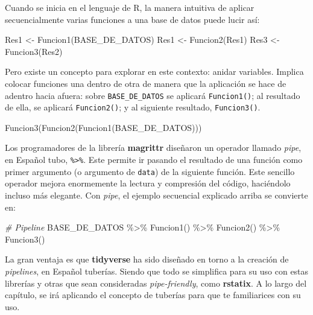 \documentclass[
]{article}
\newenvironment{Shaded}{\begin{snugshade}}{\end{snugshade}}
\newcommand{\CommentTok}[1]{\textcolor[rgb]{0.56,0.35,0.01}{\textit{#1}}}
\newcommand{\FunctionTok}[1]{\textcolor[rgb]{0.00,0.00,0.00}{#1}}
\newcommand{\NormalTok}[1]{#1}
\newcommand{\OtherTok}[1]{\textcolor[rgb]{0.56,0.35,0.01}{#1}}
\newcommand{\SpecialCharTok}[1]{\textcolor[rgb]{0.00,0.00,0.00}{#1}}
\theoremstyle{definition}
\theoremstyle{definition}
\theoremstyle{definition}
\theoremstyle{definition}
\theoremstyle{remark}
\begin{document}
Cuando se inicia en el lenguaje de R, la manera intuitiva de aplicar secuencialmente varias funciones a una base de datos puede lucir así:

\begin{Shaded}
\begin{Highlighting}[]
\NormalTok{Res1 }\OtherTok{\textless{}{-}} \FunctionTok{Funcion1}\NormalTok{(BASE\_DE\_DATOS)}
\NormalTok{Res1 }\OtherTok{\textless{}{-}} \FunctionTok{Funcion2}\NormalTok{(Res1)}
\NormalTok{Res3 }\OtherTok{\textless{}{-}} \FunctionTok{Funcion3}\NormalTok{(Res2)}
\end{Highlighting}
\end{Shaded}

Pero existe un concepto para explorar en este contexto: anidar variables. Implica colocar funciones una dentro de otra de manera que la aplicación se hace de adentro hacia afuera: sobre \texttt{BASE\_DE\_DATOS} se aplicará \texttt{Funcion1()}; al resultado de ella, se aplicará \texttt{Funcion2()}; y al siguiente resultado, \texttt{Funcion3()}.

\begin{Shaded}
\begin{Highlighting}[]
\FunctionTok{Funcion3}\NormalTok{(}\FunctionTok{Funcion2}\NormalTok{(}\FunctionTok{Funcion1}\NormalTok{(BASE\_DE\_DATOS)))}
\end{Highlighting}
\end{Shaded}

Los programadores de la librería \textbf{magrittr} diseñaron un operador llamado \emph{pipe}, en Español tubo, \texttt{\%\textgreater{}\%}. Este permite ir pasando el resultado de una función como primer argumento (o argumento de \texttt{data}) de la siguiente función. Este sencillo operador mejora enormemente la lectura y compresión del código, haciéndolo incluso más elegante. Con \emph{pipe}, el ejemplo secuencial explicado arriba se convierte en:

\begin{Shaded}
\begin{Highlighting}[]
\CommentTok{\# Pipeline}
\NormalTok{BASE\_DE\_DATOS }\SpecialCharTok{\%\textgreater{}\%} 
  \FunctionTok{Funcion1}\NormalTok{() }\SpecialCharTok{\%\textgreater{}\%} 
  \FunctionTok{Funcion2}\NormalTok{() }\SpecialCharTok{\%\textgreater{}\%} 
  \FunctionTok{Funcion3}\NormalTok{()}
\end{Highlighting}
\end{Shaded}

La gran ventaja es que \textbf{tidyverse} ha sido diseñado en torno a la creación de \emph{pipelines}, en Español tuberías. Siendo que todo se simplifica para su uso con estas librerías y otras que sean consideradas \emph{pipe-friendly}, como \textbf{rstatix}. A lo largo del capítulo, se irá aplicando el concepto de tuberías para que te familiarices con su uso.
\end{document}
